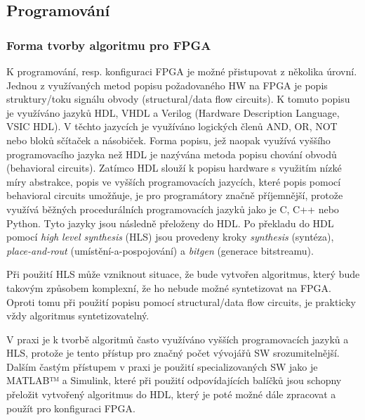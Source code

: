 \documentclass[a4paper, twoside, 11pt]{article}
\begin{document}
		\subsection{Programování}

		\subsubsection{Forma tvorby algoritmu pro FPGA}\label{subsubsec:forma-tvorby-algoritmu-pro-fpga}
		K programování, resp. konfiguraci FPGA je možné přistupovat z několika úrovní. Jednou z využívaných metod popisu požadovaného HW na FPGA je popis struktury/toku signálu obvody (structural/data flow circuits). K tomuto popisu je využíváno jazyků HDL, VHDL a Verilog (Hardware Description Language, VSIC HDL). V těchto jazycích je využíváno logických členů AND, OR, NOT nebo bloků sčítaček a násobiček. Forma popisu, jež naopak využívá vyššího programovacího jazyka než HDL je nazývána metoda popisu chování obvodů (behavioral circuits). Zatímco HDL slouží k popisu hardware s využitím nízké míry abstrakce, popis ve vyšších programovacích jazycích, které popis pomocí behavioral circuits umožňuje, je pro programátory značně příjemnější, protože využívá běžných procedurálních programovacích jazyků jako je C, C++ nebo Python. Tyto jazyky jsou následně přeloženy do HDL. Po překladu do HDL pomocí \textit{high level synthesis} (HLS) jsou provedeny kroky \textit{synthesis} (syntéza), \textit{place-and-rout} (umístění-a-pospojování) a \textit{bitgen} (generace bitstreamu). \cite{Sass2010}\par
		Při použití HLS může vzniknout situace, že bude vytvořen algoritmus, který bude takovým způsobem komplexní, že ho nebude možné syntetizovat na FPGA. Oproti tomu při použití popisu pomocí structural/data flow circuits, je prakticky vždy algoritmus syntetizovatelný. \cite{Sass2010}\par
		V praxi je k tvorbě algoritmů často využíváno vyšších programovacích jazyků a HLS, protože je tento přístup pro značný počet vývojářů SW srozumitelnější. Dalším častým přístupem v praxi je použití specializovaných SW jako je MATLAB™️ a Simulink, které při použití odpovídajících balíčků jsou schopny přeložit vytvořený algoritmus do HDL, který je poté možné dále zpracovat a použít pro konfiguraci FPGA.
\end{document}
